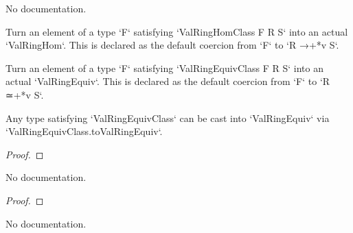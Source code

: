 \begin{definition}
\begin{definition}\label{ValRingEquivClass}
        \leanok
                No documentation.
    \end{definition}

\begin{definition}\label{ValRingHomClass.toValRingHom}
        \leanok
                Turn an element of a type `F` satisfying `ValRingHomClass F R S` into an actual
`ValRingHom`. This is declared as the default coercion from `F` to `R →+*v S`.
    \end{definition}

\begin{definition}\label{ValRingEquivClass.toValRingEquiv}
        \leanok
                Turn an element of a type `F` satisfying `ValRingEquivClass F R S` into an actual
`ValRingEquiv`. This is declared as the default coercion from `F` to `R ≃+*v S`.
    \end{definition}

\begin{theorem}\label{ValAlgebra.val_map_le_iff}
        \leanok
                Any type satisfying `ValRingEquivClass` can be cast into `ValRingEquiv` via
`ValRingEquivClass.toValRingEquiv`.
    \end{theorem}

\begin{proof}
    \leanok
\end{proof}

\begin{theorem}\label{ValAlgebra.val_map_lt_iff}
        \leanok
                No documentation.
    \end{theorem}

\begin{proof}
    \leanok
\end{proof}

\begin{theorem}\label{ValAlgebra.val_map_le_one_iff}
        \leanok
                No documentation.
    \end{theorem}


\end{definition}
